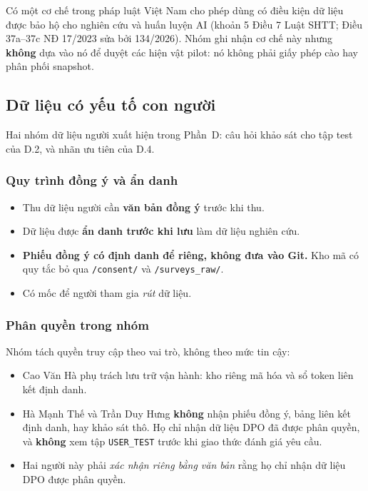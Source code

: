 Có một cơ chế trong pháp luật Việt Nam cho phép dùng có điều kiện dữ liệu được bảo
hộ cho nghiên cứu và huấn luyện AI (khoản 5 Điều 7 Luật SHTT; Điều 37a--37c
NĐ 17/2023 sửa bởi 134/2026). Nhóm ghi nhận cơ chế này nhưng \textbf{không} dựa vào
nó để duyệt các hiện vật pilot: nó không phải giấy phép cào hay phân phối snapshot.

\subsection{Dữ liệu có yếu tố con người}

Hai nhóm dữ liệu người xuất hiện trong Phần~D: câu hỏi khảo sát cho tập test của
D.2, và nhãn ưu tiên của D.4.

\subsubsection{Quy trình đồng ý và ẩn danh}

\begin{itemize}[leftmargin=2em]
\item Thu dữ liệu người cần \textbf{văn bản đồng ý} trước khi thu.
\item Dữ liệu được \textbf{ẩn danh trước khi lưu} làm dữ liệu nghiên cứu.
\item \textbf{Phiếu đồng ý có định danh để riêng, không đưa vào Git.} Kho mã có
quy tắc bỏ qua \texttt{/consent/} và \texttt{/surveys\_raw/}.
\item Có mốc để người tham gia \emph{rút} dữ liệu.
\end{itemize}

\subsubsection{Phân quyền trong nhóm}

Nhóm tách quyền truy cập theo vai trò, không theo mức tin cậy:

\begin{itemize}[leftmargin=2em]
\item Cao Văn Hà phụ trách lưu trữ vận hành: kho riêng mã hóa và sổ token liên kết
định danh.
\item Hà Mạnh Thế và Trần Duy Hưng \textbf{không} nhận phiếu đồng ý, bảng liên kết
định danh, hay khảo sát thô. Họ chỉ nhận dữ liệu DPO đã được phân quyền, và
\textbf{không} xem tập \texttt{USER\_TEST} trước khi giao thức đánh giá yêu cầu.
\item Hai người này phải \emph{xác nhận riêng bằng văn bản} rằng họ chỉ nhận dữ
liệu DPO được phân quyền.
\end{itemize}

